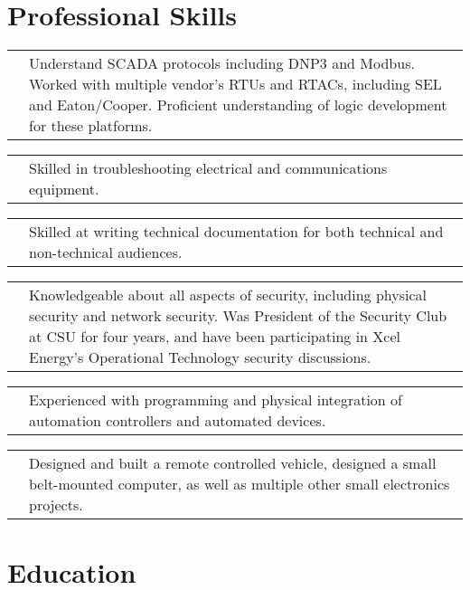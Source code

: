 \documentclass[12pt,letterpaper,sans]{moderncv}
\makeatletter
\newcommand*{\ccvitem}[3][.25em]{%
	\begin{tabular}{@{}m{\hintscolumnwidth}@{\hspace{\separatorcolumnwidth}}m{\maincolumnwidth}@{}}%
		\raggedleft\hintstyle{#2} &{#3}%
	\end{tabular}%
	\par\addvspace{#1}}
\makeatother
\begin{document}
\section{Professional Skills}
\ccvitem{Distribution Automation}{Understand SCADA protocols including DNP3 and Modbus.
		Worked with multiple vendor's RTUs and RTACs, including SEL and Eaton/Cooper.
		Proficient understanding of logic development for these platforms.}
\ccvitem{Troubleshooting}{Skilled in troubleshooting electrical and communications equipment.}
\ccvitem{Documentation}{Skilled at writing technical documentation for both technical and \newline non-technical audiences.}
\ccvitem{Systems Security}{Knowledgeable about all aspects of security,
		including physical security and network security. Was President of the Security Club
		at CSU for four years, and have been participating in Xcel Energy's
		Operational Technology \newline security discussions.}
\ccvitem{Systems Integration}{Experienced with programming and physical
		integration of automation controllers and automated devices.}
\ccvitem{Electronics Design and Robotics}{Designed and built a remote controlled
		vehicle, designed a small belt-mounted computer, as well as multiple other small
		electronics projects.}

\section{Education}
\end{document}
